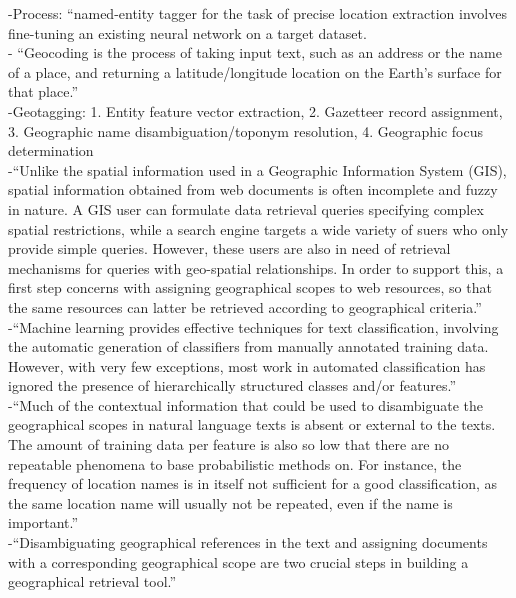 -{\color{orange}Process: “named-entity tagger for the task of precise location extraction involves fine-tuning an existing neural network on a target dataset.\cite{Gupta2020}}\\
-{\color{orange} “Geocoding is the process of taking input text, such as an address or the name of a place, and returning a latitude/longitude location on the Earth’s surface for that place.”\cite{Gupta2020}}\\
-{\color{orange}Geotagging: 1. Entity feature vector extraction, 2. Gazetteer record assignment, 3. Geographic name disambiguation/toponym resolution, 4. Geographic focus determination\cite{Teitler2008}}\\
-{\color{orange}“Unlike the spatial information used in a Geographic Information System (GIS), spatial information obtained from web documents is often incomplete and fuzzy in nature. A GIS user can formulate data retrieval queries specifying complex spatial restrictions, while a search engine targets a wide variety of suers who only provide simple queries. However, these users are also in need of retrieval mechanisms for queries with geo-spatial relationships. In order to support this, a first step concerns with assigning geographical scopes to web resources, so that the same resources can latter be retrieved according to geographical criteria.”\cite{Silva2006}}\\
-{\color{orange}“Machine learning provides effective techniques for text classification, involving the automatic generation of classifiers from manually annotated training data. However, with very few exceptions, most work in automated classification has ignored the presence of hierarchically structured classes and/or features.”\cite{Silva2006}}\\
-{\color{orange}“Much of the contextual information that could be used to disambiguate the geographical scopes in natural language texts is absent or external to the texts. The amount of training data per feature is also so low that there are no repeatable phenomena to base probabilistic methods on. For instance, the frequency of location names is in itself not sufficient for a good classification, as the same location name will usually not be repeated, even if the name is important.”\cite{Silva2006}}\\
-{\color{orange}“Disambiguating geographical references in the text and assigning documents with a corresponding geographical scope are two crucial steps in building a geographical retrieval tool.”\cite{Silva2006}}\\
